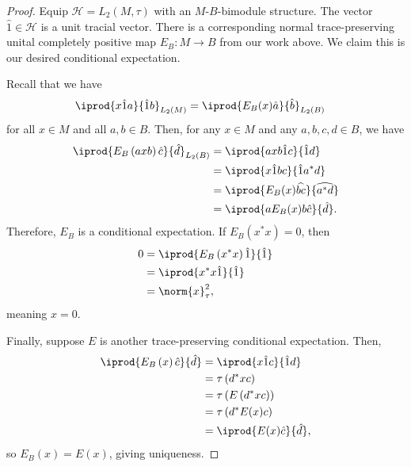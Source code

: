 \documentclass[10pt]{mypackage}
\begin{document}
\begin{proof}
  Equip $\mathcal{H}= L_2\left(M,\tau\right)$ with an $M$-$B$-bimodule structure. The vector $\hat{1}\in \mathcal{H}$ is a unit tracial vector. There is a corresponding normal trace-preserving unital completely positive map $E_B\colon M\rightarrow B$ from our work above. We claim this is our desired conditional expectation.

  Recall that we have
  \begin{align*}
    \iprod{x\hat{1}a}{\hat{1}b}_{L_2\left(M\right)} &= \iprod{E_{B}(x)\hat{a}}{\hat{b}}_{L_2\left(B\right)}
  \end{align*}
  for all $x\in M$ and all $a,b\in B$. Then, for any $x\in M$ and any $a,b,c,d\in B$, we have
  \begin{align*}
    \iprod{E_{B}\left( axb \right)\hat{c}}{\hat{d}}_{L_2(B)} &= \iprod{axb\hat{1}c}{\hat{1}d}\\
                                                             &= \iprod{x\hat{1}bc}{\hat{1}a^{\ast}d}\\
                                                             &= \iprod{E_B(x)\widehat{bc}}{\widehat{a^{\ast}d}}\\
                                                             &= \iprod{aE_B(x)b\hat{c}}{\hat{d}}.
  \end{align*}
  Therefore, $E_B$ is a conditional expectation. If $E_B\left( x^{\ast}x \right) = 0$, then
  \begin{align*}
    0 &= \iprod{E_B\left( x^{\ast}x \right)\hat{1}}{\hat{1}}\\
      &= \iprod{x^{\ast}x\hat{1}}{\hat{1}}\\
      &= \norm{x}_{\tau}^2,
  \end{align*}
  meaning $x = 0$.

  Finally, suppose $E$ is another trace-preserving conditional expectation. Then,
  \begin{align*}
    \iprod{E_B\left( x \right)\hat{c}}{\hat{d}} &= \iprod{x\hat{1}c}{\hat{1}d}\\
                                                &= \tau\left( d^{\ast}xc \right)\\
                                                &= \tau\left( E\left( d^{\ast}xc \right) \right)\\
                                                &= \tau\left( d^{\ast}E(x)c \right)\\
                                                &= \iprod{E(x)\hat{c}}{\hat{d}},
  \end{align*}
  so $E_B(x) = E(x)$, giving uniqueness.
\end{proof}
\end{document}
